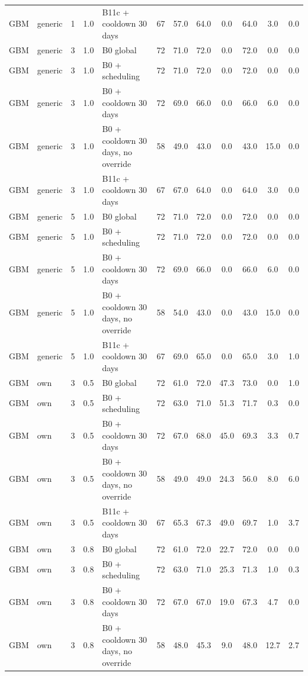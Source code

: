 \documentclass[10pt,onecolumn,letterpaper]{article}
\begin{document}
\begin{longtable}{lllllccccccc}
GBM & generic & 1 & 1.0 & B11c + cooldown 30 days & 67 & 57.0 & 64.0 & 0.0 & 64.0 & 3.0 & 0.0 \\
GBM & generic & 3 & 1.0 & B0 global & 72 & 71.0 & 72.0 & 0.0 & 72.0 & 0.0 & 0.0 \\
GBM & generic & 3 & 1.0 & B0 + scheduling & 72 & 71.0 & 72.0 & 0.0 & 72.0 & 0.0 & 0.0 \\
GBM & generic & 3 & 1.0 & B0 + cooldown 30 days & 72 & 69.0 & 66.0 & 0.0 & 66.0 & 6.0 & 0.0 \\
GBM & generic & 3 & 1.0 & B0 + cooldown 30 days, no override & 58 & 49.0 & 43.0 & 0.0 & 43.0 & 15.0 & 0.0 \\
GBM & generic & 3 & 1.0 & B11c + cooldown 30 days & 67 & 67.0 & 64.0 & 0.0 & 64.0 & 3.0 & 0.0 \\
GBM & generic & 5 & 1.0 & B0 global & 72 & 71.0 & 72.0 & 0.0 & 72.0 & 0.0 & 0.0 \\
GBM & generic & 5 & 1.0 & B0 + scheduling & 72 & 71.0 & 72.0 & 0.0 & 72.0 & 0.0 & 0.0 \\
GBM & generic & 5 & 1.0 & B0 + cooldown 30 days & 72 & 69.0 & 66.0 & 0.0 & 66.0 & 6.0 & 0.0 \\
GBM & generic & 5 & 1.0 & B0 + cooldown 30 days, no override & 58 & 54.0 & 43.0 & 0.0 & 43.0 & 15.0 & 0.0 \\
GBM & generic & 5 & 1.0 & B11c + cooldown 30 days & 67 & 69.0 & 65.0 & 0.0 & 65.0 & 3.0 & 1.0 \\
GBM & own & 3 & 0.5 & B0 global & 72 & 61.0 & 72.0 & 47.3 & 73.0 & 0.0 & 1.0 \\
GBM & own & 3 & 0.5 & B0 + scheduling & 72 & 63.0 & 71.0 & 51.3 & 71.7 & 0.3 & 0.0 \\
GBM & own & 3 & 0.5 & B0 + cooldown 30 days & 72 & 67.0 & 68.0 & 45.0 & 69.3 & 3.3 & 0.7 \\
GBM & own & 3 & 0.5 & B0 + cooldown 30 days, no override & 58 & 49.0 & 49.0 & 24.3 & 56.0 & 8.0 & 6.0 \\
GBM & own & 3 & 0.5 & B11c + cooldown 30 days & 67 & 65.3 & 67.3 & 49.0 & 69.7 & 1.0 & 3.7 \\
GBM & own & 3 & 0.8 & B0 global & 72 & 61.0 & 72.0 & 22.7 & 72.0 & 0.0 & 0.0 \\
GBM & own & 3 & 0.8 & B0 + scheduling & 72 & 63.0 & 71.0 & 25.3 & 71.3 & 1.0 & 0.3 \\
GBM & own & 3 & 0.8 & B0 + cooldown 30 days & 72 & 67.0 & 67.0 & 19.0 & 67.3 & 4.7 & 0.0 \\
GBM & own & 3 & 0.8 & B0 + cooldown 30 days, no override & 58 & 48.0 & 45.3 & 9.0 & 48.0 & 12.7 & 2.7 \\

\end{longtable}
\end{document}
